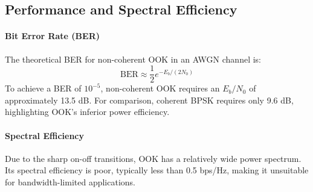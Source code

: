\subsection{Performance and Spectral Efficiency}

\paragraph{Bit Error Rate (BER)}
The theoretical BER for non-coherent OOK in an AWGN channel is:
\begin{equation}
    \text{BER} \approx \frac{1}{2}e^{-E_b/(2N_0)}
\end{equation}
To achieve a BER of $10^{-5}$, non-coherent OOK requires an $E_b/N_0$ of approximately 13.5 dB. For comparison, coherent BPSK requires only 9.6 dB, highlighting OOK's inferior power efficiency.

\paragraph{Spectral Efficiency}
Due to the sharp on-off transitions, OOK has a relatively wide power spectrum. Its spectral efficiency is poor, typically less than 0.5 bps/Hz, making it unsuitable for bandwidth-limited applications.


